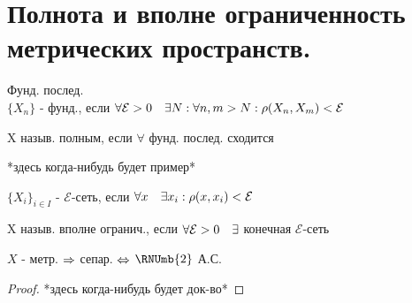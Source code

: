 \documentclass[geometry.tex]{subfiles}
\begin{document}
  \section{Полнота и вполне ограниченность метрических пространств.}

  \begin{definition}
      Фунд. послед.\\
      $\{X_n\}$ - фунд., если $\forall \mathcal{E} > 0 \quad \exists N: \forall n, m > N: \rho(X_n, X_m) < \mathcal{E}$
  \end{definition}

  \begin{definition}
      X назыв. полным, если $\forall$ фунд. послед. сходится
  \end{definition}

  \begin{example}
      *здесь когда-нибудь будет пример*
  \end{example}

  \begin{definition}
      $\{X_i\}_{i \in I}$ - $\mathcal{E}$-сеть, если $\forall x \quad \exists x_i: \rho(x, x_i) < \mathcal{E}$
  \end{definition}

  \begin{definition}
      X назыв. вполне огранич., если $\forall \mathcal{E} > 0 \quad \exists$ конечная $\mathcal{E}$-сеть
  \end{definition}

  \begin{theorem}
      $X$ - метр. $\Rightarrow$ сепар. $\Leftrightarrow$ $\RNUmb{2}$ А.С.
  \end{theorem}

  \begin{proof}
      *здесь когда-нибудь будет док-во*
  \end{proof}
\end{document}
